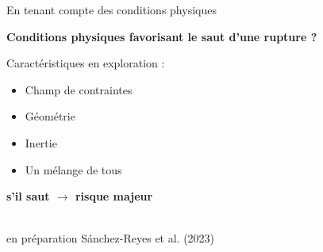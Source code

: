 \documentclass{beamer}
\begin{document}
\begin{frame}
 {En tenant compte des conditions physiques}

{\bf Conditions physiques favorisant le saut d'une rupture ?}

\begin{minipage}{0.51\linewidth}
  \hskip -3.2cm	 %
\end{minipage} 
\begin{minipage}{0.47\linewidth}
\vskip -0.7cm Caractéristiques en exploration :
\vskip 0.1cm
\begin{itemize}
 \item Champ de contraintes
 \item Géométrie
 \item Inertie
 \item Un mélange de tous
\end{itemize}
\begin{center}
\vskip 0.2cm {\small \bf s'il saut $\longrightarrow$ risque majeur }
\end{center}
\end{minipage} \\
\hfill \small en préparation Sánchez-Reyes et al. (2023)
\addtocounter{framenumber}{-1}

\end{frame}
\end{document}
